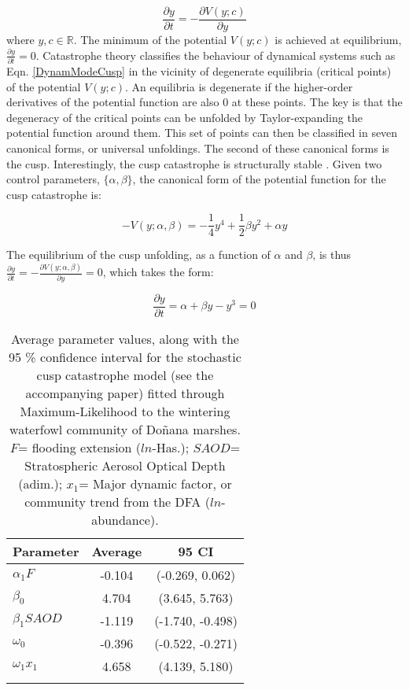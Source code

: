 \documentclass[11pt]{article}
\newcommand{\R}{\mathbb{R}}
\begin{document}
{\begin{equation}\label{DynamModeCusp}
	\frac{\partial y}{\partial t} = - \frac{\partial V(y; c)}{\partial y}
\end{equation}
where $y, c \in \R$. The minimum of the potential $ V(y; c) $ is achieved at equilibrium, $ \frac{\partial y}{\partial t} = 0 $. Catastrophe theory classifies the behaviour of dynamical systems such as Eqn. \ref{DynamModeCusp} in the vicinity of degenerate equilibria (critical points) of the potential $ V(y; c) $. An equilibria is degenerate if the higher-order derivatives of the potential function are also 0 at these points. The key is that the degeneracy of the critical points can be unfolded by Taylor-expanding the potential function around them. This set of points can then be classified in seven canonical forms, or universal unfoldings. The second of these canonical forms is the cusp. Interestingly, the cusp catastrophe is structurally stable \cite{Poston1979}. Given two control parameters, $ \{\alpha, \beta\} $, the canonical form of the potential function for the cusp catastrophe is:

\begin{equation}\label{CanonicalPotential}
	-V(y; \alpha, \beta) =  - \frac{1}{4} y^4 + \frac{1}{2}\beta y^2 + \alpha y
\end{equation}

The equilibrium of the cusp unfolding, as a function of $ \alpha $ and $ \beta $, is thus $ \frac{\partial y}{\partial t} = - \frac{\partial V(y; \alpha,\beta)}{\partial y} = 0$, which takes the form:

\begin{equation}\label{SolutionCanonical}
	\frac{\partial y}{\partial t} = \alpha + \beta y - y^3 = 0
\end{equation}

\begin{table}
	\centering
	\caption[Average parameter values for the cusp catastrophe model]{Average parameter values, along with the 95 \% confidence interval for the stochastic cusp catastrophe model (see the accompanying paper) fitted through Maximum-Likelihood to the wintering waterfowl community of Doñana marshes. $F$= flooding extension ($ln$-Has.); $SAOD$= Stratospheric Aerosol Optical Depth (adim.); $x_{1}$= Major dynamic factor, or community trend from the DFA ($ln$-abundance).}
	\label{tab:TableCusp}
	\begin{tabular}{lcc}%
		\toprule
		\textbf{Parameter} & \textbf{Average} & \textbf{95 CI} \\
		\midrule
		$ \alpha_{1}F $ & -0.104 & (-0.269, 0.062) \\
		$ \beta_{0} $ & 4.704 & (3.645, 5.763) \\
		$ \beta_{1}SAOD $ & -1.119 & (-1.740, -0.498) \\
		$ \omega_{0} $ & -0.396 & (-0.522, -0.271) \\
		$ \omega_{1}x_{1} $ & 4.658 & (4.139, 5.180) \\
		\bottomrule
		&& \\
	\end{tabular}
\end{table}

}
\end{document}
